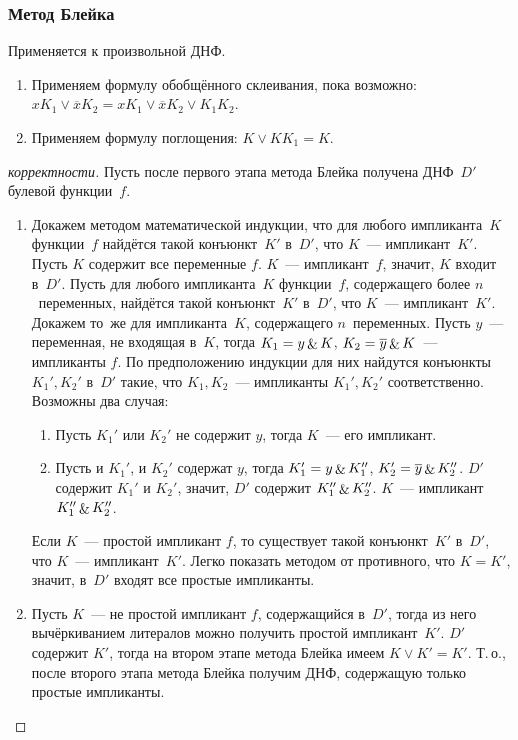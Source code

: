 \subsubsection{Метод Блейка}
Применяется к произвольной ДНФ.
\begin{enumerate}
	\item Применяем формулу обобщённого склеивания, пока возможно: $x K_1 \lor \overline x K_2 =
	x K_1 \lor \overline x K_2 \lor K_1 K_2$.
	
	\item Применяем формулу поглощения: $K \lor K K_1 = K$.
\end{enumerate}
\begin{proof}[корректности]
Пусть после первого этапа метода Блейка получена ДНФ~$D'$ булевой функции~$f$.
\begin{enumerate}
	\item Докажем методом математической индукции, что для любого импликанта~$K$ функции~$f$ найдётся такой конъюнкт~$K'$ в~$D'$, что $K$~--- импликант~$K'$.
		\indbase Пусть $K$ содержит все переменные $f$.
		$K$~--- импликант~$f$, значит, $K$ входит в~$D'$.
		\indstep Пусть для любого импликанта~$K$ функции~$f$, содержащего более $n$~переменных, найдётся такой конъюнкт~$K'$ в~$D'$, что $K$~--- импликант~$K'$.
		Докажем то~же для импликанта~$K$, содержащего $n$~переменных.
		Пусть $y$~--- переменная, не входящая в~$K$, тогда $K_1 = y \mathop{\&} K$, $K_2 = \overline y \mathop{\&} K$~--- импликанты $f$.
		По предположению индукции для них найдутся конъюнкты~$K_1', K_2'$ в~$D'$ такие, что $K_1, K_2$~--- импликанты $K_1', K_2'$ соответственно.
		Возможны два случая:
		\begin{enumerate}
			\item Пусть $K_1'$ или $K_2'$ не содержит $y$, тогда $K$~--- его импликант.
			\item Пусть и $K_1'$, и $K_2'$ содержат $y$, тогда $K_1' = y \mathop{\&} K_1''$, $K_2' = \overline y \mathop{\&} K_2''$.
			$D'$ содержит $K_1'$ и $K_2'$, значит, $D'$ содержит $K_1'' \mathop{\&} K_2''$.
			$K$~--- импликант $K_1'' \mathop{\&} K_2''$.
		\end{enumerate}
		\indend
	
	Если $K$~--- простой импликант $f$, то существует такой конъюнкт~$K'$ в~$D'$, что $K$~--- импликант~$K'$.
	Легко показать методом от противного, что $K = K'$, значит, в~$D'$ входят все простые импликанты.
	
	\item Пусть $K$~--- не простой импликант $f$, содержащийся в~$D'$, тогда из него вычёркиванием литералов можно получить простой импликант~$K'$.
	$D'$ содержит $K'$, тогда на втором этапе метода Блейка имеем $K \lor K' = K'$.
	Т.\,о., после второго этапа метода Блейка получим ДНФ, содержащую только простые импликанты.
\end{enumerate}
\end{proof}

